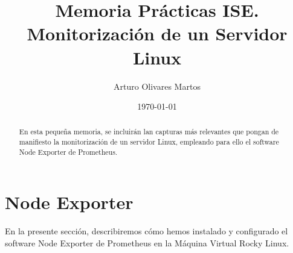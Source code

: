 \documentclass[a4paper,12pt]{article}
\title{Memoria Prácticas ISE.\\Monitorización de un Servidor Linux}
\author{Arturo Olivares Martos}
\date{\today}
\begin{document}
\maketitle

\begin{abstract}
    En esta pequeña memoria, se incluirán lan capturas más relevantes que pongan de manifiesto la monitorización de un servidor Linux, empleando para ello el software Node Exporter de Prometheus.
\end{abstract}


\tableofcontents
\newpage

\section{Node Exporter}

En la presente sección, describiremos cómo hemos instalado y configurado el software Node Exporter de Prometheus en la Máquina Virtual Rocky Linux.
\end{document}
